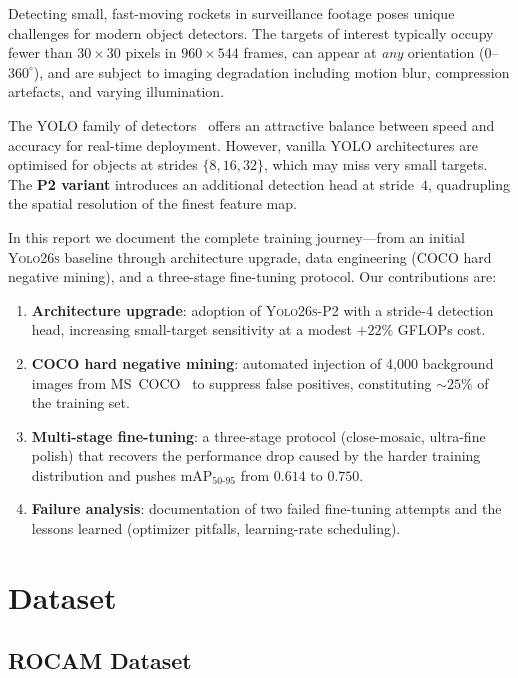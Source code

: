 \documentclass[12pt, titlepage]{article}
\begin{document}
Detecting small, fast-moving rockets in surveillance footage poses unique
challenges for modern object detectors. The targets of interest typically
occupy fewer than $30{\times}30$ pixels in $960{\times}544$ frames, can appear
at \emph{any} orientation ($0$--$360^{\circ}$), and are subject to imaging
degradation including motion blur, compression artefacts, and varying
illumination.

The YOLO family of detectors~\citep{ultralytics2025yolo} offers an attractive
balance between speed and accuracy for real-time deployment. However, vanilla
YOLO architectures are optimised for objects at strides $\{8, 16, 32\}$, which
may miss very small targets. The \textbf{P2 variant} introduces an additional
detection head at stride~$4$, quadrupling the spatial resolution of the finest
feature map.

In this report we document the complete training journey---from an initial
\textsc{Yolo26s} baseline through architecture upgrade, data engineering (COCO
hard negative mining), and a three-stage fine-tuning protocol. Our
contributions are:

\begin{enumerate}[leftmargin=*]
  \item \textbf{Architecture upgrade}: adoption of \textsc{Yolo26s-P2} with a
        stride-4 detection head, increasing small-target sensitivity
        at a modest $+22\%$ GFLOPs cost.
  \item \textbf{COCO hard negative mining}: automated injection of
        4{,}000 background images from MS~COCO~\citep{lin2014coco} to
        suppress false positives, constituting $\sim\!25\%$ of the
        training set.
  \item \textbf{Multi-stage fine-tuning}: a three-stage protocol
        (close-mosaic, ultra-fine polish) that recovers the
        performance drop caused by the harder training distribution
        and pushes mAP$_{50\text{-}95}$ from $0.614$ to $0.750$.
  \item \textbf{Failure analysis}: documentation of two failed
        fine-tuning attempts and the lessons learned (optimizer
        pitfalls, learning-rate scheduling).
\end{enumerate}

\section{Dataset}
\label{sec:dataset}

\subsection{ROCAM Dataset}
\end{document}
